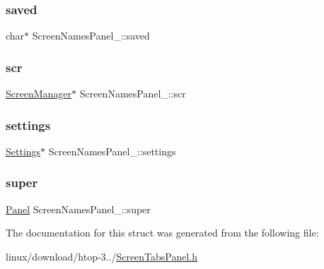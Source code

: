 \subsubsection{\texorpdfstring{saved}{saved}}
{\footnotesize\ttfamily char$\ast$ Screen\+Names\+Panel\+\_\+\+::saved}

\mbox{\label{structScreenNamesPanel___a0e95a6e2b9cccc62948c1c1fe3df3d0a}} 
\subsubsection{\texorpdfstring{scr}{scr}}
{\footnotesize\ttfamily \hyperlink{ScreenManager_8h_a798c9c69dc8024a4c6829982bf94dddd}{Screen\+Manager}$\ast$ Screen\+Names\+Panel\+\_\+\+::scr}

\mbox{\label{structScreenNamesPanel___a4d61e740a5d780cd77efeb4e560e38c7}} 
\subsubsection{\texorpdfstring{settings}{settings}}
{\footnotesize\ttfamily \hyperlink{Settings_8h_ad97e5960b63f21c02bf5e0e43c0ef002}{Settings}$\ast$ Screen\+Names\+Panel\+\_\+\+::settings}

\mbox{\label{structScreenNamesPanel___adbb5fbf02b3abdbbc3760a0d86b0c466}} 
\subsubsection{\texorpdfstring{super}{super}}
{\footnotesize\ttfamily \hyperlink{Panel_8h_a034d4c16521db412dc7a1e8536d16fae}{Panel} Screen\+Names\+Panel\+\_\+\+::super}



The documentation for this struct was generated from the following file\+:\begin{DoxyCompactItemize}
\item 
linux/download/htop-\/3../\hyperlink{ScreenTabsPanel_8h}{Screen\+Tabs\+Panel.\+h}\end{DoxyCompactItemize}
